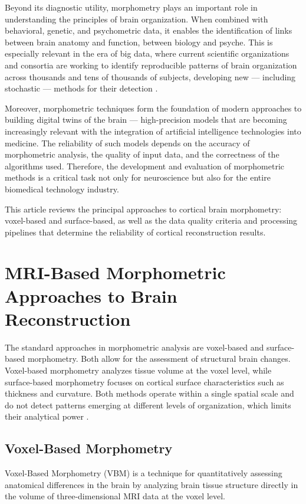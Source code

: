 \documentclass[default]{subfiles}
\begin{document}
Beyond its diagnostic utility, morphometry plays an important role in understanding the principles of brain
organization. When combined with behavioral, genetic, and psychometric data, it enables the identification of links
between brain anatomy and function, between biology and psyche. This is especially relevant in the era of big data,
where current scientific organizations and consortia are working to identify reproducible patterns of brain
organization across thousands and tens of thousands of subjects, developing new — including stochastic — methods for
their detection \cite{daoudi_2024, kurella_2023, cruz_2021, mosch_2023}.

Moreover, morphometric techniques form the foundation of modern approaches to building digital twins of the brain —
high-precision models that are becoming increasingly relevant with the integration of artificial intelligence
technologies into medicine. The reliability of such models depends on the accuracy of morphometric analysis, the
quality of input data, and the correctness of the algorithms used. Therefore, the development and evaluation of
morphometric methods is a critical task not only for neuroscience but also for the entire biomedical technology
industry.

This article reviews the principal approaches to cortical brain morphometry: voxel-based and surface-based, as well as
the data quality criteria and processing pipelines that determine the reliability of cortical reconstruction results.

\section{MRI-Based Morphometric Approaches to Brain Reconstruction}

The standard approaches in morphometric analysis are voxel-based and surface-based morphometry. Both allow for the
assessment of structural brain changes. Voxel-based morphometry analyzes tissue volume at the voxel level, while
surface-based morphometry focuses on cortical surface characteristics such as thickness and curvature. Both methods
operate within a single spatial scale and do not detect patterns emerging at different levels of organization, which
limits their analytical power \cite{cao_2023}.

\subsection{Voxel-Based Morphometry}
Voxel-Based Morphometry (VBM) is a technique for quantitatively assessing anatomical differences in the brain by
analyzing brain tissue structure directly in the volume of three-dimensional MRI data at the voxel level.
\end{document}

